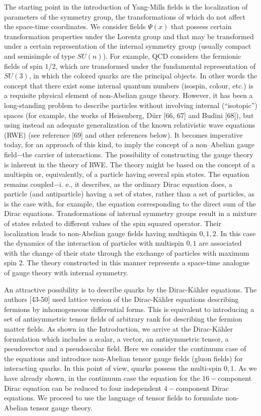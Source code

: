 \documentclass[a4paper,12pt]{article}
\begin{document}
The starting point in the introduction of Yang-Mills fields is the
localization of parameters of the symmetry group, the transformations of
which do not affect the space-time coordinates. We consider fields $\Psi (x)$
that possess certain transformation properties under the Lorentz group and
that may be transformed under a certain representation of the internal
symmetry group (usually compact and semisimple of type $SU(n)$). For
example, QCD considers the fermionic fields of spin $1/2$, which are
transformed under the fundamental representation of $SU(3)$, in which the
colored quarks are the principal objects. In other words the concept that
there exist some internal quantum numbers (isospin, colour, etc.) is a
requisite physical element of non-Abelian gauge theory. However, it has been
a long-standing problem to describe particles without involving internal
(``isotopic'') spaces (for example, the works of Heisenberg, D\"urr [66, 67]
and Budini [68]), but using instead an adequate generalization of the known
relativistic wave equations (RWE) (see reference [69] and other references
below). It becomes imperative today, for an approach of this kind, to imply
the concept of a non--Abelian gauge field$-$the carrier of interactions. The
possibility of constructing the gauge theory is inherent in the theory of
RWE. The theory might be based on the concept of a multispin or,
equivalently, of a particle having several spin states. The equation remains
coupled$-$i. e., it describes, as the ordinary Dirac equation does, a
particle (and antiparticle) having a set of states, rather than a set of
particles, as is the case with, for example, the equation corresponding to
the direct sum of the Dirac equations. Transformations of internal symmetry
groups result in a mixture of states related to different values of the spin
squared operator. Their localization leads to non-Abelian gauge fields
having multispin $0,1,2$. In this case the dynamics of the interaction of
particles with multispin $0,1$ are associated with the change of their state
through the exchange of particles with maximum spin $2$. The theory
constructed in this manner represents a space-time analogue of gauge theory
with internal symmetry.

An attractive possibility is to describe quarks by the Dirac-K\"ahler
equations. The authors [43-50] used lattice version of the Dirac-K\"ahler
equations describing fermions by inhomogeneous differential forms. This is
equivalent to introducing a set of antisymmetric tensor fields of arbitrary
rank for describing the fermion matter fields. As shown in the Introduction,
we arrive at the Dirac-K\"ahler formulation which includes a scalar, a
vector, an antisymmetric tensor, a pseudovector and a pseudoscalar field.
Here we consider the continuum case of the equations and introduce
non-Abelian tensor gauge fields (gluon fields) for interacting quarks. In
this point of view, quarks possess the multi-spin $0,1$. As we have already
shown, in the continuum case the equation for the $16-$component Dirac
equation can be reduced to four independent $4-$component Dirac equations.
We proceed to use the language of tensor fields to formulate non-Abelian
tensor gauge theory.
\end{document}
